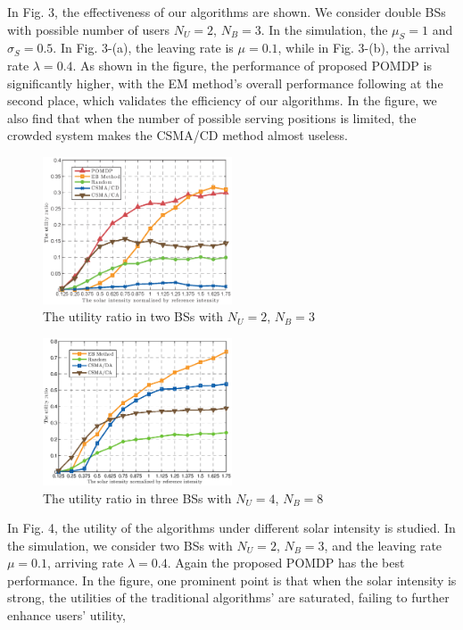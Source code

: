 \documentclass[conference]{IEEEtran}
\begin{document}
\indent 
In Fig. 3, the effectiveness of our algorithms are shown.
We consider double BSs with possible number of users \(N_U = 2\), \(N_B = 3\).
In the simulation, the \(\mu_S = 1\) and \(\sigma_S = 0.5\).
In Fig. 3-(a), the leaving rate is \(\mu = 0.1\), while in Fig. 3-(b), the arrival rate \(\lambda = 0.4\).
As shown in the figure, the performance of proposed POMDP is significantly higher,
with the EM method's overall performance following at the second place,
which validates the efficiency of our algorithms.
In the figure, we also find that when the number of possible serving positions is limited, 
the crowded system makes the CSMA/CD method almost useless.\\
\begin{figure}[t]
\centering
\includegraphics[width=0.5\textwidth]{4_fig3.eps}
\caption{The utility ratio in two BSs with \(N_U = 2\), \(N_B=3\)}
\end{figure}
\begin{figure}[t]
\centering
\includegraphics[width=0.5\textwidth]{4_fig4.eps}
\caption{The utility ratio in three BSs with \(N_U = 4\), \(N_B=8\)}
\end{figure}
\indent In Fig. 4, the utility of the algorithms under different solar intensity is studied.
In the simulation, we consider two BSs with \(N_U = 2\), \(N_B = 3\),
and the leaving rate \(\mu = 0.1\), arriving rate \(\lambda = 0.4\).
Again the proposed POMDP has the best performance.
In the figure, one prominent point is that when the solar intensity is strong,
the utilities of the traditional algorithms' are saturated, failing to further enhance users' utility, 
\end{document}
